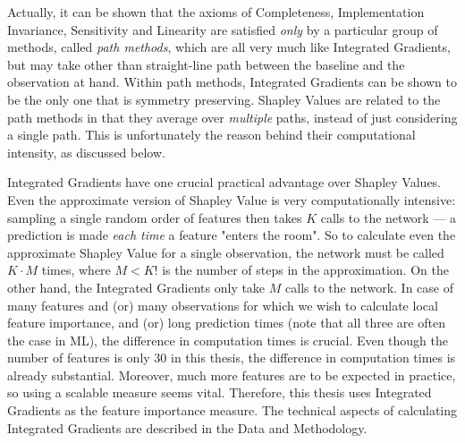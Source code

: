			Actually, it can be shown \citep{sundararajan2017axiomatic} that the axioms of Completeness, Implementation Invariance, Sensitivity and Linearity are satisfied \textit{only} by a particular group of methods, called \textit{path methods}, which are all very much like Integrated Gradients, but may take other than straight-line path between the baseline and the observation at hand. Within path methods, Integrated Gradients can be shown \citep{sundararajan2017axiomatic} to be the only one that is symmetry preserving. Shapley Values are related to the path methods in that they average over \textit{multiple} paths, instead of just considering a single path. This is unfortunately the reason behind their computational intensity, as discussed below.  
			
			Integrated Gradients have one crucial practical advantage over Shapley Values. Even the approximate version of Shapley Value \citep{vstrumbelj2014explaining} is very computationally intensive: sampling a single random order of features then takes $K$ calls to the network --- a prediction is made \textit{each time} a feature "enters the room". So to calculate even the approximate Shapley Value for a single observation, the network must be called $K\cdot M$ times, where $M < K!$ is the number of steps in the approximation. On the other hand, the Integrated Gradients only take $M$ calls to the network. In case of many features and (or) many observations for which we wish to calculate local feature importance, and (or) long prediction times (note that all three are often the case in ML), the difference in computation times is crucial. Even though the number of features is only 30 in this thesis, the difference in computation times is already substantial. Moreover, much more features are to be expected in practice, so using a scalable measure seems vital. Therefore, this thesis uses Integrated Gradients as the feature importance measure. The technical aspects of calculating Integrated Gradients are described in the Data and Methodology. 
			
